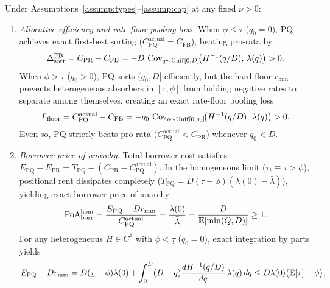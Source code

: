 \begin{theorem}\label{thm:poa}
Under Assumptions~\ref{assump:types}--\ref{assump:cap} at any fixed $\nu > 0$:
\begin{enumerate}[label=(\roman*), leftmargin=2.2em, itemsep=2pt]
\item \emph{Allocative efficiency and rate-floor pooling loss.} When $\phi \le \underline{\tau}$ ($q_0 = 0$), $\mathrm{PQ}$ achieves exact first-best sorting ($C_{\mathrm{PQ}}^{\mathrm{actual}} = C_{\mathrm{FB}}$), beating pro-rata by
\begin{equation}\label{eq:sort_gain}
\Delta_{\mathrm{sort}}^{\mathrm{FB}} = C_{\mathrm{PR}} - C_{\mathrm{FB}} = -D\,\operatorname{Cov}_{q \sim \mathrm{Unif}[0, D]}\!\bigl(H^{-1}(q/D),\, \lambda(q)\bigr) > 0.
\end{equation}
When $\phi > \underline{\tau}$ ($q_0 > 0$), $\mathrm{PQ}$ sorts $(q_0, D]$ efficiently, but the hard floor $r_{\min}$ prevents heterogeneous absorbers in $[\underline{\tau}, \phi]$ from bidding negative rates to separate among themselves, creating an exact rate-floor pooling loss
\begin{equation}\label{eq:floor_loss}
L_{\mathrm{floor}} = C_{\mathrm{PQ}}^{\mathrm{actual}} - C_{\mathrm{FB}} = -q_0\,\operatorname{Cov}_{q \sim \mathrm{Unif}[0, q_0]}\!\bigl(H^{-1}(q/D),\, \lambda(q)\bigr) > 0.
\end{equation}
Even so, $\mathrm{PQ}$ strictly beats pro-rata ($C_{\mathrm{PQ}}^{\mathrm{actual}} < C_{\mathrm{PR}}$) whenever $q_0 < D$.
\item \emph{Borrower price of anarchy.} Total borrower cost satisfies $E_{\mathrm{PQ}} - E_{\mathrm{PR}} = T_{\mathrm{PQ}} - (C_{\mathrm{PR}} - C_{\mathrm{PQ}}^{\mathrm{actual}})$. In the homogeneous limit ($\tau_i \equiv \tau > \phi$), positional rent dissipates completely ($T_{\mathrm{PQ}} = D(\tau - \phi)(\lambda(0) - \bar{\lambda})$), yielding exact borrower price of anarchy
\begin{equation}\label{eq:poa_hom}
\mathrm{PoA}_{\mathrm{borr}}^{\mathrm{hom}} = \frac{E_{\mathrm{PQ}} - D r_{\min}}{C_{\mathrm{PQ}}^{\mathrm{actual}}} = \frac{\lambda(0)}{\bar{\lambda}} = \frac{D}{\mathbb{E}[\min(Q, D)]} \ge 1.
\end{equation}
For any heterogeneous $H \in C^1$ with $\phi < \underline{\tau}$ ($q_0 = 0$), exact integration by parts yields
\begin{equation}\label{eq:virtual_cost}
E_{\mathrm{PQ}} - D r_{\min} = D(\underline{\tau} - \phi)\lambda(0) + \int_0^D (D - q)\frac{d H^{-1}(q/D)}{dq}\,\lambda(q)\,dq \le D\lambda(0)\bigl(\E[\tau] - \phi\bigr),

\end{equation}
\end{enumerate}
\end{theorem}

